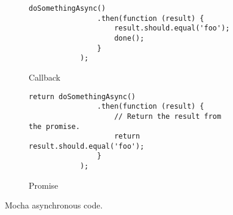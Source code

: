 
\newcommand{\mochasize}{\scriptsize}
\begin{figure}[H]
	\centering
	\begin{subfigure}[b]{0.45\textwidth}
        \begin{lstlisting}[basicstyle=\mochasize]
			doSomethingAsync()
				.then(function (result) {
        			result.should.equal('foo');
        			done();
    			}
			);
		\end{lstlisting}
        \caption{Callback}
        \label{fig:mocha_callback}
    \end{subfigure}
    \begin{subfigure}[b]{0.5\textwidth}
		\begin{lstlisting}[basicstyle=\mochasize]
			return doSomethingAsync()
				.then(function (result) {
					// Return the result from the promise.
        			return result.should.equal('foo');
    			}
			);
		\end{lstlisting}
        \caption{Promise}
        \label{fig:mocha_promise}
    \end{subfigure}
	\caption[Mocha asynchronous code]{Mocha asynchronous code.}
	\label{fig:mocha_asynchronous_code}
\end{figure}
